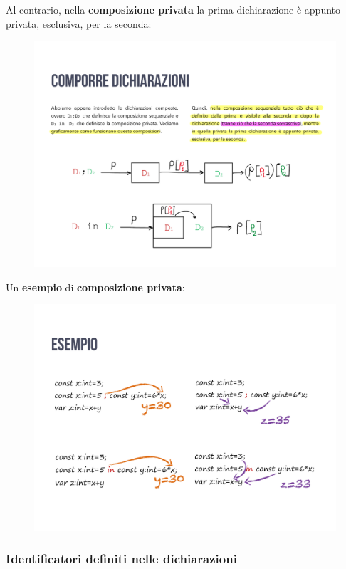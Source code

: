 \documentclass[a4paper]{article}
\begin{document}
	\noindent
	Al contrario, nella \textbf{composizione privata} la prima dichiarazione è appunto privata, esclusiva, per la seconda:
	\begin{figure}[!htp]
		\centering
		\includegraphics[width=\textwidth]{img/composizione_privata.pdf}
	\end{figure}

	\noindent
	Un \textcolor{Green4}{\textbf{esempio}} di \textbf{composizione privata}:
	\begin{figure}[!htp]
		\centering
		\includegraphics[width=\textwidth]{img/esempio_composizione_privata.pdf}
	\end{figure}\newpage
	
	\subsubsection{Identificatori definiti nelle dichiarazioni}\label{identificatori definiti}
	
\end{document}
